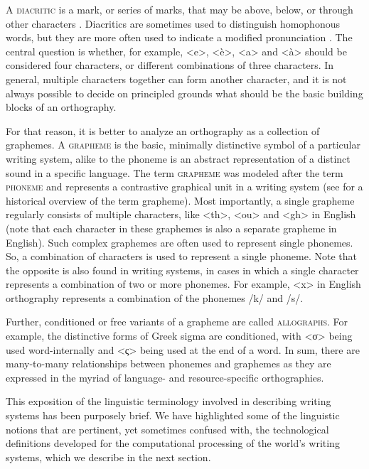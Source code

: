 A \textsc{diacritic} is a mark, or series of marks, that may be above, below, or
through other characters \citep{Gaultney2002}. Diacritics are sometimes used to
distinguish homophonous words, but they are more often used to indicate a
modified pronunciation \citep[xli]{DanielsBright1996}. The central question is
whether, for example, <e>, <è>, <a> and <à> should be considered four
characters, or different combinations of three characters. In general, multiple
characters together can form another character, and it is not always possible to
decide on principled grounds what should be the basic building blocks of an
orthography.

For that reason, it is better to analyze an orthography as a collection of
graphemes. A \textsc{grapheme} is the basic, minimally distinctive symbol of a
particular writing system, alike to the phoneme is an abstract representation of
a distinct sound in a specific language. The term \textsc{grapheme} was modeled
after the term \textsc{phoneme} and represents a contrastive graphical unit in a
writing system (see \citet{Kohrt1986} for a historical overview of the term
grapheme). Most importantly, a single grapheme regularly consists of multiple
characters, like <th>, <ou> and <gh> in English (note that each character in
these graphemes is also a separate grapheme in English). Such complex graphemes
are often used to represent single phonemes. So, a combination of characters is
used to represent a single phoneme. Note that the opposite is also found in
writing systems, in cases in which a single character represents a combination
of two or more phonemes. For example, <x> in English orthography represents a
combination of the phonemes /k/ and /s/.

Further, conditioned or free variants of a grapheme are called
\textsc{allographs}. For example, the distinctive forms of Greek sigma are
conditioned, with <σ> being used word-internally and <ς> being used at the end
of a word. In sum, there are many-to-many relationships between phonemes and
graphemes as they are expressed in the myriad of language- and resource-specific
orthographies.

This exposition of the linguistic terminology involved in describing writing
systems has been purposely brief. We have highlighted some of the linguistic
notions that are pertinent, yet sometimes confused with, the technological
definitions developed for the computational processing of the world's writing
systems, which we describe in the next section.

